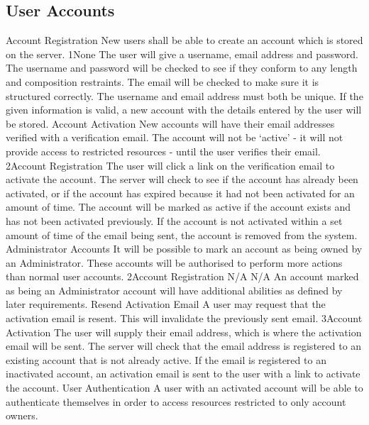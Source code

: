 	\subsection{User Accounts}
		\funcreq
			{Account Registration}
			{New users shall be able to create an account which is stored on 
			the server.}
			{1}{None}
			{The user will give a username, email address and password.}
			{The username and password will be checked to see if they conform 
			to any length and composition restraints. The email will be 
			checked to make sure it is structured correctly. The username and 
			email address must both be unique.}
			{If the given information is valid, a new account with the details 
			entered by the user will be stored.}
		\funcreq
			{Account Activation}
			{New accounts will have their email addresses verified with a 
			verification email. The account will not be `active' - it will not 
			provide access to restricted resources - until the user verifies 
			their email.}
			{2}{Account Registration}
			{The user will click a link on the verification email to activate 
			the account.}
			{The server will check to see if the account has already been 
			activated, or if the account has expired because it had not been 
			activated for an amount of time.}
			{The account will be marked as active if the account exists and 
			has not been activated previously. If the account is not activated 
			within a set amount of time of the email being sent, the account 
			is removed from the system.}
		\funcreq
			{Administrator Accounts}
			{It will be possible to mark an account as being owned by an 
			Administrator. These accounts will be authorised to perform more 
			actions than normal user accounts.}
			{2}{Account Registration}
			{N/A}
			{N/A}
			{An account marked as being an Administrator account will have 
			additional abilities as defined by later requirements.}
		\funcreq
			{Resend Activation Email}
			{A user may request that the activation email is resent. This will 
			invalidate the previously sent email.}
			{3}{Account Activation}
			{The user will supply their email address, which is where the 
			activation email will be sent.}
			{The server will check that the email address is registered to an 
			existing account that is not already active.}
			{If the email is registered to an inactivated account, an 
			activation email is sent to the user with a link to activate the 
			account.}
		\funcreq
			{User Authentication}
			{A user with an activated account will be able to authenticate 
			themselves in order to access resources restricted to only account 
			owners.}
